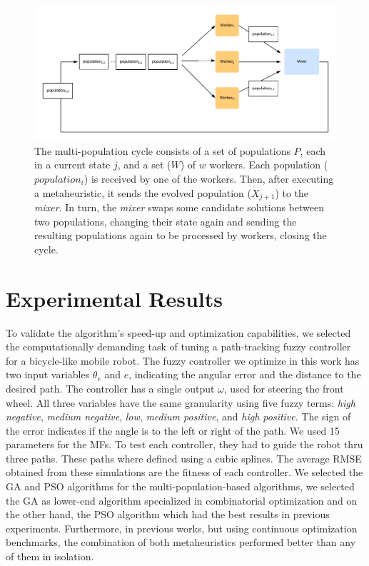 \documentclass[runningheads]{llncs}
\begin{document}
\begin{figure}
\includegraphics[width=\textwidth]{images/worker-pop}
    \caption{ The multi-population cycle consists of a set of populations $P$, each in a
current state $j$, and a set ($W$) of $w$ workers. Each population
($population_{i}$) is received by one of the workers. Then, after executing a
metaheuristic, it sends the evolved population ($X_{j+1}$) to the
\emph{mixer}. In turn, the \emph{mixer} swaps some candidate
solutions between two populations, changing their state again and sending the
resulting populations again to be processed by workers, closing the cycle.
}\label{fig:worker-pop}
\end{figure}

\section{Experimental Results}

To validate the algorithm’s speed-up and optimization capabilities, we selected
the computationally demanding task of tuning a path-tracking fuzzy controller
for a bicycle-like mobile robot. The fuzzy controller we optimize in this work
has two input variables $\theta_e$ and $e$, indicating the angular error and
the distance  to the desired path. The controller has a single output $\omega$,
used for steering the front wheel. All three variables have the same
granularity using five fuzzy terms: \emph{high negative}, \emph{medium
negative}, \emph{low}, \emph{medium positive}, and \emph{high positive}. The
sign of the error indicates if the angle is to the left or right of the path.
We used 15 parameters for the MFs. To test each controller, they had to guide
the robot thru three paths. These paths where defined using a cubic splines.
The average RMSE obtained from these simulations are the fitness of each 
controller. We selected the GA and PSO algorithms for the multi-population-based
algorithms, we selected the GA as lower-end algorithm specialized in combinatorial 
optimization and on the other hand, the PSO algorithm which had the best results in
previous experiments. Furthermore, in previous works, but using
continuous optimization benchmarks, the combination of both metaheuristics
performed better than any of them in isolation.
\end{document}
